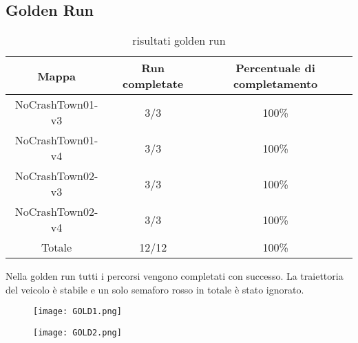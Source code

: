 \subsection{Golden Run}
\begin{table}[h]
    \begin{tabular}{|c|c|c|}
        \hline
        Mappa                   & Run completate & Percentuale di completamento\\
        \hline
        NoCrashTown01-v3        & 3/3            & 100\% \\
        NoCrashTown01-v4        & 3/3            & 100\% \\
        NoCrashTown02-v3        & 3/3            & 100\% \\
        NoCrashTown02-v4        & 3/3            & 100\%  \\
        Totale                  & 12/12          & 100\% \\
        \hline
    \end{tabular}
    \caption{risultati golden run}
Nella golden run tutti i percorsi vengono completati con successo. La traiettoria del veicolo è stabile e un solo semaforo rosso in totale è stato ignorato.
\end{table}
\begin{figure}[h!]
    \centering
    \parbox{6cm}{
    \texttt{[image: GOLD1.png]}
    \label{fig:gold1}}
    \qquad
    \begin{minipage}{6cm}
    \texttt{[image: GOLD2.png]}
    \label{fig:gold2}
    \end{minipage}
    \label{fig:goldrun}
    \end{figure}
\newpage
